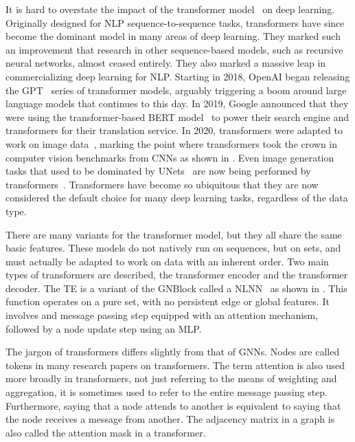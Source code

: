 It is hard to overstate the impact of the transformer model~\cite{Attention} on deep learning.
Originally designed for \Gls{NLP} sequence-to-sequence tasks, transformers have since become the dominant model in many areas of deep learning.
They marked such an improvement that research in other sequence-based models, such as recursive neural networks, almost ceased entirely.
They also marked a massive leap in commercializing deep learning for \Gls{NLP}.
Starting in 2018, OpenAI began releasing the GPT~\cite{GPT} series of transformer models, arguably triggering a boom around large language models that continues to this day.
In 2019, Google announced that they were using the transformer-based BERT model~\cite{BERT} to power their search engine and transformers for their translation service.
In 2020, transformers were adapted to work on image data~\cite{VisionTransformer}, marking the point where transformers took the crown in computer vision benchmarks from \Glspl{CNN} as shown in .
Even image generation tasks that used to be dominated by UNets~\cite{Unet, DiffusionBeatsGANS} are now being performed by transformers~\cite{DIT, SD3}.
Transformers have become so ubiquitous that they are now considered the default choice for many deep learning tasks, regardless of the data type.

There are many variants for the transformer model, but they all share the same basic features.
These models do not natively run on sequences, but on sets, and must actually be adapted to work on data with an inherent order.
Two main types of transformers are described, the transformer encoder and the transformer decoder.
The \Gls{TE} is a variant of the \Gls{GNBlock} called a \Gls{NLNN}~\cite{NonlocalNeuralNetworks} as shown in .
This function operates on a pure set, with no persistent edge or global features.
It involves and message passing step equipped with an attention mechanism, followed by a node update step using an \Gls{MLP}\@.

The jargon of transformers differs slightly from that of \Glspl{GNN}.
Nodes are called tokens in many research papers on transformers.
The term attention is also used more broadly in transformers, not just referring to the means of weighting and aggregation, it is sometimes used to refer to the entire message passing step.
Furthermore, saying that a node attends to another is equivalent to saying that the node receives a message from another.
The adjacency matrix in a graph is also called the attention mask in a transformer.


